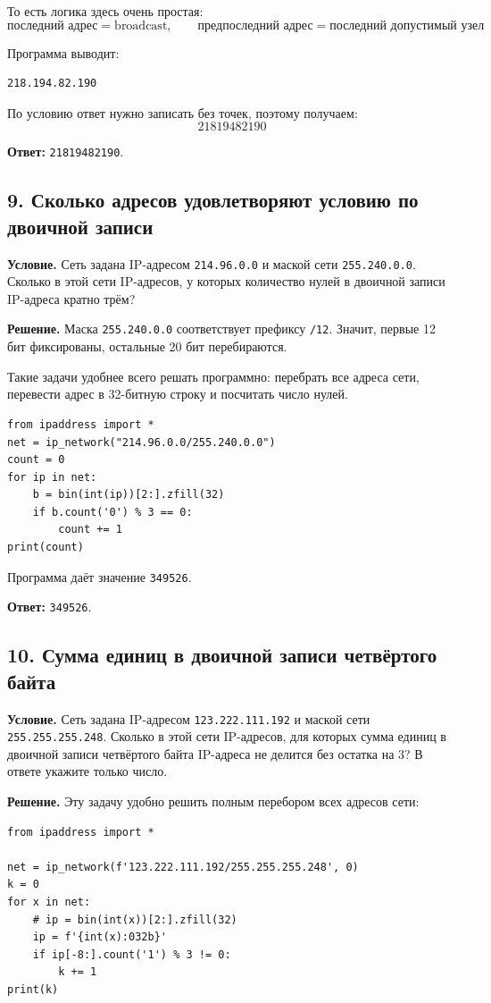\documentclass[11pt]{article}
\begin{document}
То есть логика здесь очень простая:
\[
\text{последний адрес} = \text{broadcast}, \qquad \text{предпоследний адрес} = \text{последний допустимый узел}
\]

Программа выводит:
\begin{verbatim}
218.194.82.190
\end{verbatim}

По условию ответ нужно записать без точек, поэтому получаем:
\[
21819482190
\]

\textbf{Ответ:} \texttt{21819482190}.

\subsection*{9. Сколько адресов удовлетворяют условию по двоичной записи}

\textbf{Условие.} Сеть задана IP-адресом \texttt{214.96.0.0} и маской сети \texttt{255.240.0.0}. Сколько в этой сети IP-адресов, у которых количество нулей в двоичной записи IP-адреса кратно трём?

\textbf{Решение.} Маска \texttt{255.240.0.0} соответствует префиксу \texttt{/12}. Значит, первые 12 бит фиксированы, остальные 20 бит перебираются.

Такие задачи удобнее всего решать программно: перебрать все адреса сети, перевести адрес в 32-битную строку и посчитать число нулей.

\begin{verbatim}
from ipaddress import *
net = ip_network("214.96.0.0/255.240.0.0")
count = 0
for ip in net:
    b = bin(int(ip))[2:].zfill(32)
    if b.count('0') % 3 == 0:
        count += 1
print(count)
\end{verbatim}

Программа даёт значение \texttt{349526}.

\textbf{Ответ:} \texttt{349526}.

\subsection*{10. Сумма единиц в двоичной записи четвёртого байта}

\textbf{Условие.} Сеть задана IP-адресом \texttt{123.222.111.192} и маской сети \texttt{255.255.255.248}. Сколько в этой сети IP-адресов, для которых сумма единиц в двоичной записи четвёртого байта IP-адреса не делится без остатка на 3? В ответе укажите только число.

\textbf{Решение.} Эту задачу удобно решить полным перебором всех адресов сети:
\begin{verbatim}
from ipaddress import *

net = ip_network(f'123.222.111.192/255.255.255.248', 0)
k = 0
for x in net:
    # ip = bin(int(x))[2:].zfill(32)
    ip = f'{int(x):032b}'
    if ip[-8:].count('1') % 3 != 0:
        k += 1
print(k)
\end{verbatim}
\end{document}
